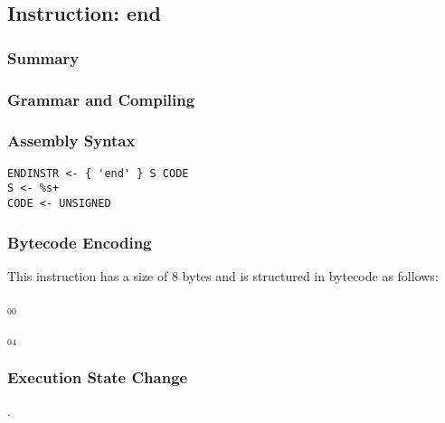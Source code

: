 \subsection{Instruction: end}

\subsubsection{Summary}


\subsubsection{Grammar and Compiling}


\subsubsection{Assembly Syntax}

\begin{myquote}
\begin{verbatim}
ENDINSTR <- { 'end' } S CODE
S <- %s+
CODE <- UNSIGNED
\end{verbatim}
\end{myquote}


\subsubsection{Bytecode Encoding}

This instruction has a size of 8 bytes and is structured in bytecode as follows:

$_{00}$\ 



$_{04}$\ 


\subsubsection{Execution State Change}

.


